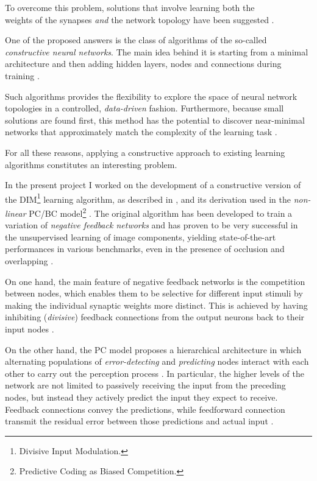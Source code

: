 \documentclass[11pt,a4paper]{report}
\begin{document}
			To overcome this problem, solutions that involve learning both the\\weights of the synapses \emph{and} the network topology have been suggested \cite{parekh2000constructive}.
		
		
			One of the proposed answers is the class of algorithms of the so-called \emph{constructive neural networks}. The main idea behind it is starting from a minimal architecture and then adding hidden layers, nodes and connections during training \cite{kotsiantis2007supervised,sharma2010constructive}.
		
			Such algorithms provides the flexibility to explore the space of neural network topologies in a controlled, \emph{data-driven} fashion. Furthermore, because small solutions are found first, this method has the potential to discover near-minimal networks that approximately match the complexity of the learning task \cite{parekh2000constructive}.
		
			For all these reasons, applying a constructive approach to existing learning algorithms constitutes an interesting problem.
		
			\newpage
		
			In the present project I worked on the development of a constructive version of the DIM\footnote{Divisive Input Modulation.} learning algorithm, as described in \cite{spratling2009unsupervised}, and its derivation \cite{spratling2012unsupervised} used in the \emph{non-linear} PC/BC model\footnote{Predictive Coding as Biased Competition.} \cite{spratling2008predictive}. The original algorithm has been developed to train a variation of \emph{negative feedback networks} and has proven to be very successful in the unsupervised learning of image components, yielding state-of-the-art performances in various benchmarks, even in the presence of occlusion and overlapping \cite{spratling2009unsupervised}.
		
			On one hand, the main feature of negative feedback networks is the competition between nodes, which enables them to be selective for different input stimuli by making the individual synaptic weights more distinct. This is achieved by having inhibiting (\emph{divisive}) feedback connections from the output neurons back to their input nodes \cite{spratling2009unsupervised}. 
		
			On the other hand, the PC model proposes a hierarchical architecture in which alternating populations of \emph{error-detecting} and \emph{predicting} nodes interact with each other to carry out the perception process \cite{spratling2014predictive}. In particular, the higher levels of the network are not limited to passively receiving the input from the preceding nodes, but instead they actively predict the input they expect to receive. Feedback connections convey the predictions, while feedforward connection transmit the residual error between those predictions and actual input \cite{spratling2008predictive}.
\end{document}
